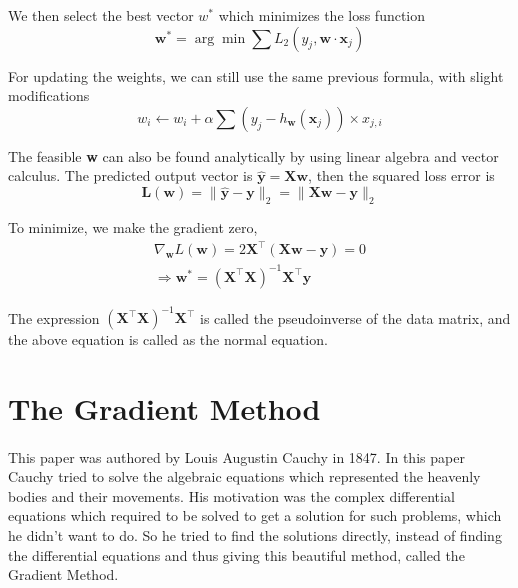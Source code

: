\documentclass{article}
\begin{document}
            We then select the best vector $w^*$ which minimizes the loss function
            \begin{equation*}
                \mathbf{w}^* = \arg\min \sum L_2(y_j, \mathbf{w} \cdot \mathbf{x}_j)
            \end{equation*}

            For updating the weights, we can still use the same previous formula, with slight modifications
            \begin{equation*}
                w_i \leftarrow w_i + \alpha \sum (y_j - h_{\mathbf{w}}(\mathbf{x}_j)) \times x_{j,i}
            \end{equation*}

            The feasible \textbf{w} can also be found analytically by using linear algebra and vector calculus. The predicted output vector is $\hat{\mathbf{y}} = \mathbf{Xw}$, then the squared loss error is 
            \begin{equation*}
                \mathbf{L}(\mathbf{w}) = \| \hat{\mathbf{y}} - \mathbf{y} \|_2 = \| \mathbf{X} \mathbf{w} - \mathbf{y} \|_2
            \end{equation*}

                To minimize, we make the gradient zero,
                \begin{align*}
                    \nabla_{\mathbf{w}} L(\mathbf{w}) = 2 \mathbf{X}^{\top} (\mathbf{X} \mathbf{w} - \mathbf{y}) = 0\\
                    \Rightarrow \mathbf{w}^* = (\mathbf{X}^{\top} \mathbf{X})^{-1} \mathbf{X}^{\top} \mathbf{y}
                \end{align*}

                The expression $(\mathbf{X}^{\top} \mathbf{X})^{-1} \mathbf{X}^{\top} $ is called the pseudoinverse of the data matrix, and the above equation is called as the normal equation.

\newpage
\section{The Gradient Method}
    \paragraph{}
        This paper was authored by Louis Augustin Cauchy in 1847. In this paper Cauchy tried to solve the algebraic equations which represented the heavenly bodies and their movements. His motivation was the complex differential equations which required to be solved to get a solution for such problems, which he didn’t want to do. So he tried to find the solutions directly, instead of finding the differential equations and thus giving this beautiful method, called the Gradient Method.
\end{document}
